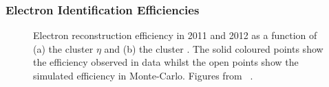 \subsubsection{Electron Identification Efficiencies}

\begin{figure}[h]
\centering
\caption{Electron reconstruction efficiency in 2011 and 2012 as a function of (a) the cluster
$\eta$ and (b) the cluster \et. The solid coloured points show the efficiency
observed in data whilst the open points show the simulated efficiency in
Monte-Carlo. Figures
from
~\cite{EfficiencyPileup,ElectronEfficiency2011}.
}
\label{fig:el-id-eff}
\end{figure}


